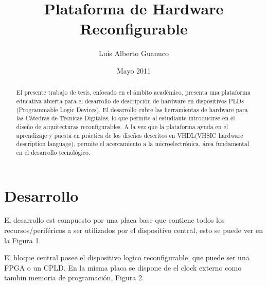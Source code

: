 \documentclass[10pt,a4paper,titlepage,spanish]{article}
\begin{document}
\author{Luis Alberto Guanuco}
\title{Plataforma de Hardware Reconfigurable}
\date{Mayo 2011}
\maketitle
{}
\begin{abstract}
El presente trabajo de tesis, enfocado en el ámbito académico, presenta una plataforma educativa abierta para el desarrollo de descripción de hardware en dispositivos PLDs (Programmable Logic Devices). El desarrollo cubre las herramientas de hardware para las Cátedras de Técnicas Digitales, lo que permite al estudiante introducirse en el diseño de arquitecturas reconfigurables. A la vez que la plataforma ayuda en el aprendizaje y puesta en práctica de los diseños descritos en VHDL(VHSIC hardware description language), permite el acercamiento a la microelectrónica, área fundamental en el desarrollo tecnológico.
\end{abstract}

\section{Desarrollo}

El desarrollo est compuesto por una placa base que contiene todos los recursos/periféricos a ser utilizados por el dispositivo central, esto se puede ver en la Figura 1.
%


%

El bloque central posee el dispositivo logico reconfigurable, que puede ser una FPGA o un CPLD. En la misma placa se dispone de el clock externo como tambin memoria de programación, Figura 2.
\end{document}
